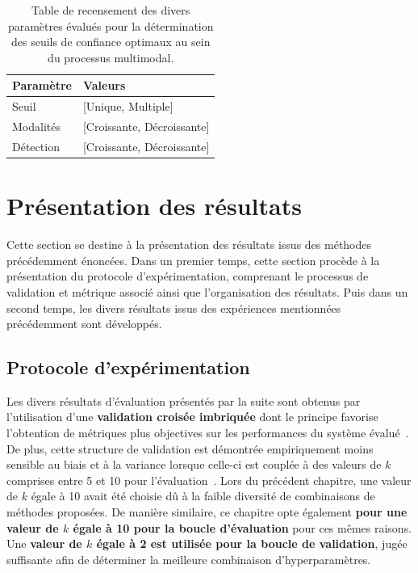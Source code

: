 \begin{table}[H]
    \centering
    \begin{tabular}{ll}
        \toprule 
        Paramètre                   & Valeurs                   \\ \midrule
        Seuil                       & [Unique, Multiple]        \\ \midrule
        Modalités                   & [Croissante, Décroissante]\\ \midrule
        Détection                   & [Croissante, Décroissante]\\ \bottomrule
    \end{tabular}
    \caption{Table de recensement des divers paramètres évalués pour la détermination des seuils de confiance optimaux au sein du processus multimodal.}
    \label{tab:multimodal_confidence_model_values}
\end{table}
 
\clearpage

\section{Présentation des résultats}
Cette section se destine à la présentation des résultats issus des méthodes précédemment énoncées. Dans un premier temps, cette section procède à la présentation du protocole d'expérimentation, comprenant le processus de validation et métrique associé ainsi que l'organisation des résultats. Puis dans un second temps, les divers résultats issus des expériences mentionnées précédemment sont développés.\par

\subsection{Protocole d’expérimentation}
Les divers résultats d'évaluation présentés par la suite sont obtenus par l'utilisation d'une \textbf{validation croisée imbriquée} dont le principe favorise l'obtention de métriques plus objectives sur les performances du système évalué~\cite{Cawley2010}. De plus, cette structure de validation est démontrée empiriquement moins sensible au biais et à la variance lorsque celle-ci est couplée à des valeurs de $k$ comprises entre 5 et 10 pour l'évaluation~\cite{James2013}. Lors du précédent chapitre, une valeur de $k$ égale à 10 avait été choisie dû à la faible diversité de combinaisons de méthodes proposées. De manière similaire, ce chapitre opte également \textbf{pour une valeur de $k$ égale à 10 pour la boucle d'évaluation} pour ces mêmes raisons. Une \textbf{valeur de $k$ égale à 2 est utilisée pour la boucle de validation}, jugée suffisante afin de déterminer la meilleure combinaison d'hyperparamètres.\par

